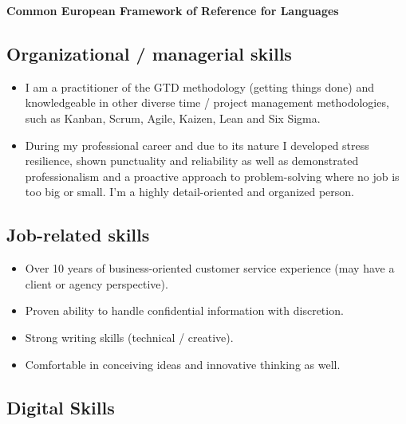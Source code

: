 \documentclass{article}
\begin{document}
\textbf{Common European Framework of Reference for Languages}

\subsection{Organizational / managerial skills}


\begin{itemize}
\setlength\itemsep{0em}

\item I am a practitioner of the GTD methodology (getting things done) and knowledgeable in other diverse time / project management methodologies, such as Kanban, Scrum, Agile, Kaizen, Lean and Six Sigma.

\item During my professional career and due to its nature I developed stress resilience, shown punctuality and reliability as well as demonstrated professionalism and a proactive approach to problem-solving where no job is too big or small. I'm a highly detail-oriented and organized person.
\end{itemize}

\subsection{Job-related skills}

\begin{itemize}
\setlength\itemsep{0em}

\item Over 10 years of business-oriented customer service experience (may have a client or agency perspective).

\item Proven ability to handle confidential information with discretion.

\item Strong writing skills (technical / creative).

\item Comfortable in conceiving ideas and innovative thinking as well.

\end{itemize}

\subsection{Digital Skills}
\end{document}
